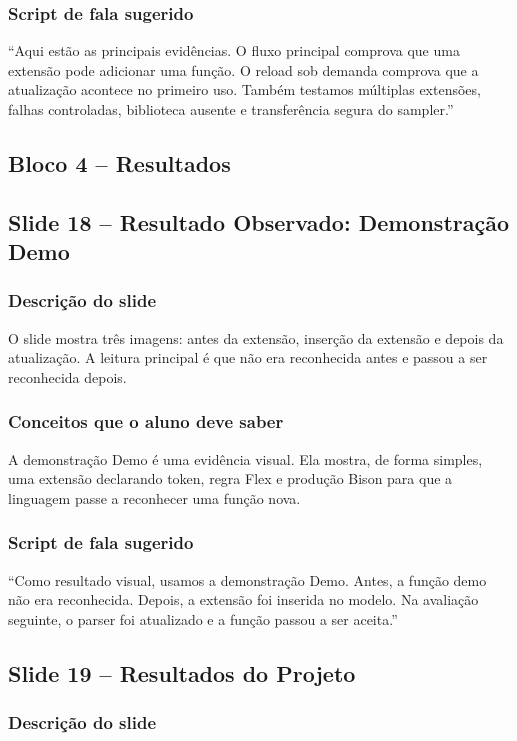 \documentclass[12pt,a4paper]{article}
\newcommand{\codeid}[1]{\texttt{\detokenize{#1}}}
\newcommand{\slide}[2]{\subsection{Slide #1 -- #2}}
\begin{document}
\subsubsection*{Script de fala sugerido}

``Aqui est\~ao as principais evid\^encias. O fluxo principal comprova que uma extens\~ao pode adicionar uma fun\c{c}\~ao. O reload sob demanda comprova que a atualiza\c{c}\~ao acontece no primeiro uso. Tamb\'em testamos m\'ultiplas extens\~oes, falhas controladas, biblioteca ausente e transfer\^encia segura do sampler.''

\subsection*{Bloco 4 -- Resultados}

\slide{18}{Resultado Observado: Demonstra\c{c}\~ao Demo}

\subsubsection*{Descri\c{c}\~ao do slide}

O slide mostra tr\^es imagens: antes da extens\~ao, inser\c{c}\~ao da extens\~ao e depois da atualiza\c{c}\~ao. A leitura principal \'e que \codeid{demo()} n\~ao era reconhecida antes e passou a ser reconhecida depois.

\subsubsection*{Conceitos que o aluno deve saber}

A demonstra\c{c}\~ao Demo \'e uma evid\^encia visual. Ela mostra, de forma simples, uma extens\~ao declarando token, regra Flex e produ\c{c}\~ao Bison para que a linguagem passe a reconhecer uma fun\c{c}\~ao nova.

\subsubsection*{Script de fala sugerido}

``Como resultado visual, usamos a demonstra\c{c}\~ao Demo. Antes, a fun\c{c}\~ao demo n\~ao era reconhecida. Depois, a extens\~ao foi inserida no modelo. Na avalia\c{c}\~ao seguinte, o parser foi atualizado e a fun\c{c}\~ao passou a ser aceita.''

\slide{19}{Resultados do Projeto}

\subsubsection*{Descri\c{c}\~ao do slide}
\end{document}
